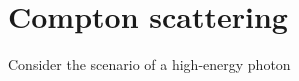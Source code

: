 
\section{Compton scattering}
\label{sec:compton-scattering}

Consider the scenario of a high-energy photon  
